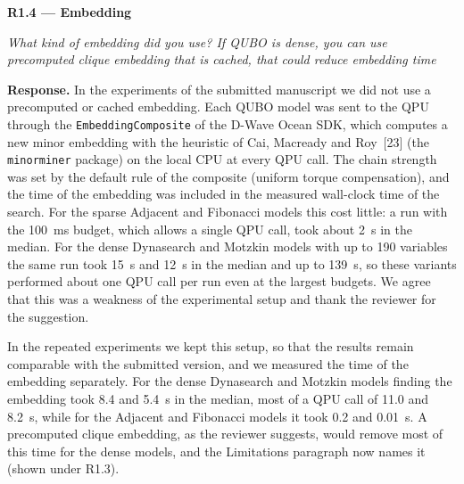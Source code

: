 \documentclass[12pt]{article}
\newenvironment{rc}[1]{\par\medskip\noindent\textbf{#1}\par\nopagebreak\noindent\itshape\renewcommand{\emph}[1]{\textbf{##1}}\ignorespaces}{\par}
\newcommand{\answer}[1]{\par\smallskip\noindent\textbf{Response.} #1\par}
\begin{document}
\begin{rc}{R1.4 --- Embedding}
What kind of embedding did you use? If QUBO is dense, you can use precomputed clique embedding that is cached, that could reduce embedding time
\end{rc}
\answer{In the experiments of the submitted manuscript we did not use a precomputed or cached embedding. Each QUBO model was sent to the QPU through the \texttt{EmbeddingComposite} of the D-Wave Ocean SDK, which computes a new minor embedding with the heuristic of Cai, Macready and Roy~[23] (the \texttt{minorminer} package) on the local CPU at every QPU call. The chain strength was set by the default rule of the composite (uniform torque compensation), and the time of the embedding was included in the measured wall-clock time of the search. For the sparse Adjacent and Fibonacci models this cost little: a run with the 100~ms budget, which allows a single QPU call, took about 2~s in the median. For the dense Dynasearch and Motzkin models with up to 190 variables the same run took 15~s and 12~s in the median and up to 139~s, so these variants performed about one QPU call per run even at the largest budgets. We agree that this was a weakness of the experimental setup and thank the reviewer for the suggestion.}
In the repeated experiments we kept this setup, so that the results remain comparable with the submitted version, and we measured the time of the embedding separately. For the dense Dynasearch and Motzkin models finding the embedding took 8.4 and 5.4~s in the median, most of a QPU call of 11.0 and 8.2~s, while for the Adjacent and Fibonacci models it took 0.2 and 0.01~s. A precomputed clique embedding, as the reviewer suggests, would remove most of this time for the dense models, and the Limitations paragraph now names it (shown under R1.3).
\end{document}
